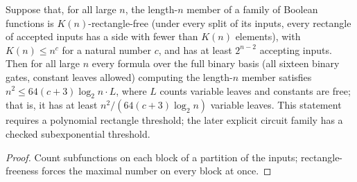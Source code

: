 \begin{theorem}[Nechiporuk]
  \label{thm:lowerbounds-algebraic-nechiporuk}
  \leanok
  Suppose that, for all large $n$, the length-$n$ member of a family of
  Boolean functions is $K(n)$-rectangle-free (under every split of its inputs,
  every rectangle of accepted inputs has a side with fewer than $K(n)$
  elements), with $K(n) \le n^c$ for a natural number $c$, and has at least
  $2^{n - 2}$ accepting inputs. Then for all large $n$ every formula over the
  full binary basis (all sixteen binary gates, constant leaves allowed)
  computing the length-$n$ member satisfies
  $n^2 \le 64(c + 3)\log_2 n \cdot L$, where $L$ counts variable leaves and
  constants are free; that is, it has at least $n^2 / (64(c + 3)\log_2 n)$
  variable leaves. This statement requires a polynomial rectangle threshold;
  the later explicit circuit family has a checked subexponential threshold.
\end{theorem}
\begin{proof}
  \leanok
  Count subfunctions on each block of a partition of the inputs;
  rectangle-freeness forces the maximal number on every block at once.
\end{proof}

